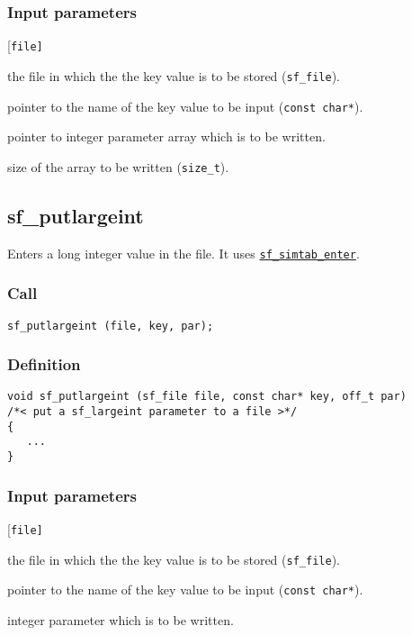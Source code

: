 \subsubsection*{Input parameters}
\begin{desclist}{\tt }{\quad}[\tt file]
   \setlength\itemsep{0pt}
   \item[file] the file in which the the key value is to be stored (\texttt{sf\_file}).
   \item[key]  pointer to the name of the key value to be input (\texttt{const char*}).
   \item[par]  pointer to integer parameter array which is to be written. 
   \item[n]    size of the array to be written (\texttt{size\_t}).
\end{desclist}



\subsection{{sf\_putlargeint}}
Enters a long integer value in the file. It uses \hyperref[sec:sf_simtab_enter]{\texttt{sf\_simtab\_enter}}.  

\subsubsection*{Call}
\begin{verbatim}sf_putlargeint (file, key, par);\end{verbatim}

\subsubsection*{Definition}
\begin{verbatim}
void sf_putlargeint (sf_file file, const char* key, off_t par)
/*< put a sf_largeint parameter to a file >*/
{
   ...
}
\end{verbatim}

\subsubsection*{Input parameters}
\begin{desclist}{\tt }{\quad}[\tt file]
   \setlength\itemsep{0pt}
   \item[file] the file in which the the key value is to be stored (\texttt{sf\_file}).
   \item[key]  pointer to the name of the key value to be input (\texttt{const char*}).
   \item[par]  integer parameter which is to be written.
\end{desclist}





